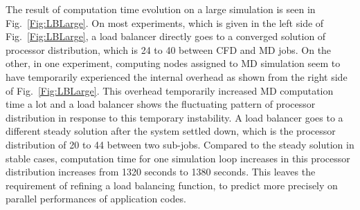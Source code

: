 \documentclass[conference,final]{IEEEtran}
\begin{document}
The result of computation time evolution on a large simulation is seen
in Fig.~\ref{Fig:LBLarge}. On most experiments, which is given in the
left side of Fig.~\ref{Fig:LBLarge}, a load balancer directly goes to
a converged solution of processor distribution, which is 24 to 40
between CFD and MD jobs. On the other, in one experiment, computing
nodes assigned to MD simulation seem to have temporarily experienced
the internal overhead as shown from the right side of
Fig.~\ref{Fig:LBLarge}. This overhead temporarily increased MD
computation time a lot and a load balancer shows the fluctuating
pattern of processor distribution in response to this temporary
instability. A load balancer goes to a different steady solution after
the system settled down, which is the processor distribution of 20 to
44 between two sub-jobs. Compared to the steady solution in stable
cases, computation time for one simulation loop increases in this
processor distribution increases from 1320 seconds to 1380
seconds. This leaves the requirement of refining a load balancing
function, to predict more precisely on parallel performances of
application codes.
\end{document}
